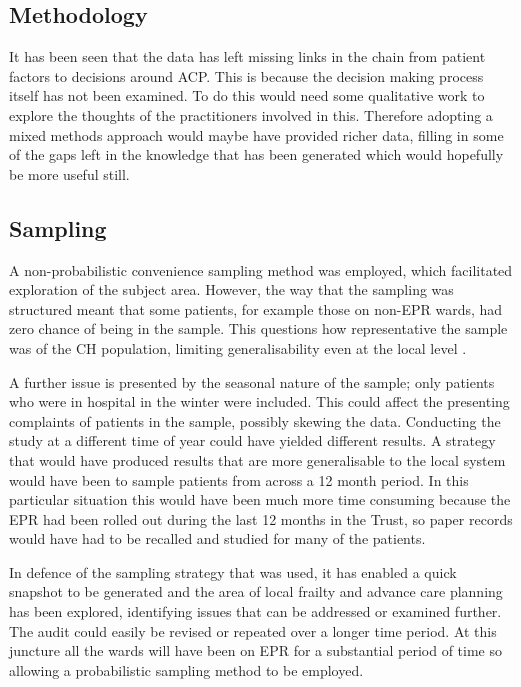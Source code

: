 \documentclass
[
	12pt,
	a4paper,
	oneside,
]{report}
\begin{document}
\subsection{Methodology}

It has been seen that the data has left missing links in the 
chain from patient factors to decisions around ACP. This is because the
decision making process itself has not been examined. To do this would need 
some qualitative work to explore the thoughts of the practitioners involved
in this. Therefore adopting a mixed methods approach 
would maybe have provided richer data, filling in some of the gaps left in the
knowledge that has been generated which would hopefully be more useful still.

\subsection{Sampling}
A non-probabilistic convenience sampling method was employed, which facilitated 
exploration of the subject area. However, the way that the sampling was 
structured meant that some patients, for example those on non-EPR wards, had
zero chance of being in the sample. This questions how representative the sample
was of the CH population, limiting generalisability even at the local level 
\parencite{biggam:15}.

A further issue is presented by the seasonal 
nature of the sample; only patients who were in hospital in the winter were 
included. This could affect the presenting complaints of patients in the sample,
possibly skewing the data.
Conducting the study at a different time of year could have yielded different 
results. A strategy that would have produced results that are more generalisable
to the local system would have been to sample patients from across
a 12 month period. In this particular situation this would have been much more
time consuming because the EPR had been rolled out during the last 12 months in
the Trust, so paper records would have had to be recalled and studied for many
of the patients. 

In defence of the sampling strategy that was used, it has enabled a quick 
snapshot to be generated and the area of local frailty and advance care planning
has been explored, identifying issues that can be
addressed or examined further. The audit could easily be revised or repeated 
over a longer time period. At this juncture all the wards 
will have been on EPR for a substantial period of time so
allowing a probabilistic sampling method to be employed.
\end{document}
